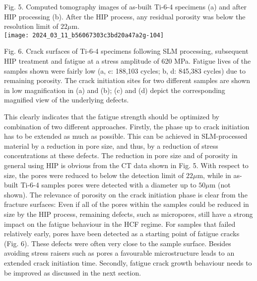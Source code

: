 \documentclass[10pt]{article}
\begin{document}
Fig. 5. Computed tomography images of as-built Ti-6-4 specimens (a) and after HIP processing (b). After the HIP process, any residual porosity was below the resolution limit of $22 \mu \mathrm{m}$.\\
\texttt{[image: 2024\_03\_11\_b56067303c3bd20a47a2g-104]}

Fig. 6. Crack surfaces of Ti-6-4 specimens following SLM processing, subsequent HIP treatment and fatigue at a stress amplitude of 620 MPa. Fatigue lives of the samples shown were fairly low (a, c: 188,103 cycles; b, d: 845,383 cycles) due to remaining porosity. The crack initiation sites for two different samples are shown in low magnification in (a) and (b); (c) and (d) depict the corresponding magnified view of the underlying defects.

This clearly indicates that the fatigue strength should be optimized by combination of two different approaches. Firstly, the phase up to crack initiation has to be extended as much as possible. This can be achieved in SLM-processed material by a reduction in pore size, and thus, by a reduction of stress concentrations at these defects. The reduction in pore size and of porosity in general using HIP is obvious from the CT data shown in Fig. 5. With respect to size, the pores were reduced to below the detection limit of $22 \mu \mathrm{m}$, while in as-built Ti-6-4 samples pores were detected with a diameter up to $50 \mu \mathrm{m}$ (not shown). The relevance of porosity on the crack initiation phase is clear from the fracture surfaces: Even if all of the pores within the samples could be reduced in size by the HIP process, remaining defects, such as micropores, still have a strong impact on the fatigue behaviour in the HCF regime. For samples that failed relatively early, pores have been detected as a starting point of fatigue cracks (Fig. 6). These defects were often very close to the sample surface. Besides avoiding stress raisers such as pores a favourable microstructure leads to an extended crack initiation time. Secondly, fatigue crack growth behaviour needs to be improved as discussed in the next section.
\end{document}
